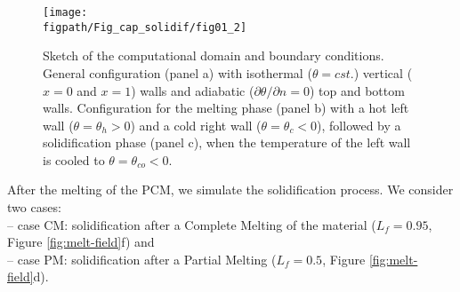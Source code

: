 \begin{figure}
	\begin{center}
		\texttt{[image: \\figpath/Fig\_cap\_solidif/fig01\_2]}
	\end{center}
	\caption{Sketch of the computational domain and boundary conditions. General configuration (panel a) with isothermal ($\theta=cst.$) vertical ($x=0$ and $x=1$) walls and  adiabatic ($\partial \theta/\partial n = 0$) top and bottom walls. Configuration for the melting phase (panel b) with a hot left wall ($\theta=\theta_h > 0$) and a cold right wall ($\theta=\theta_c < 0$), followed by a solidification phase (panel c), when the temperature of the left wall is cooled to $\theta=\theta_{co} < 0$.}
	\label{fig: pcm-case}
\end{figure}
After the melting of the PCM, we simulate the solidification process. We consider two cases: \\ 
-- case CM: solidification after a Complete Melting of the material ($L_f=0.95$, Figure \ref{fig:melt-field}f) and \\
-- case PM: solidification after a Partial Melting ($L_f=0.5$, Figure \ref{fig:melt-field}d). \\
